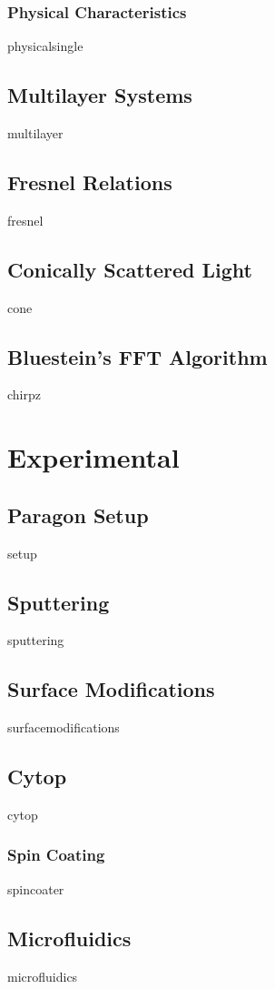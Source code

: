 \documentclass[a4paper,titlepage,onecolumn]{report}
\begin{document}
  \subsection{Physical Characteristics}
  {physicalsingle}
 \section{Multilayer Systems}
 {multilayer}
 \section{Fresnel Relations}
 {fresnel}
 \section{Conically Scattered Light}\label{sec:coneexist}
 {cone}
 \section{Bluestein's FFT Algorithm}
 {chirpz}

\chapter{Experimental} \label{ch:experimental}
 \section{Paragon Setup}
 {setup}
 \section{Sputtering}
 {sputtering}
 \section{Surface Modifications}
  {surfacemodifications}
 \section{Cytop}
 {cytop}
  \subsection{Spin Coating}
  {spincoater}
 \section{Microfluidics}
 {microfluidics}
\end{document}
